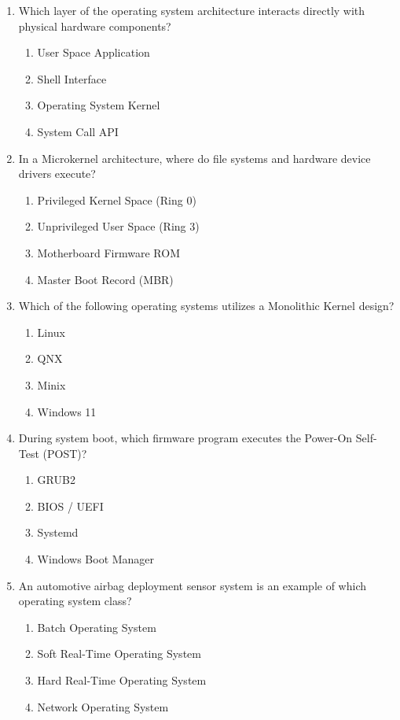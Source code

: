 \begin{enumerate}[leftmargin=1.5em]
    \item Which layer of the operating system architecture interacts directly with physical hardware components?
    \begin{enumerate}[label=(\alph*)]
        \item User Space Application
        \item Shell Interface
        \item Operating System Kernel
        \item System Call API
    \end{enumerate}

    \item In a Microkernel architecture, where do file systems and hardware device drivers execute?
    \begin{enumerate}[label=(\alph*)]
        \item Privileged Kernel Space (Ring 0)
        \item Unprivileged User Space (Ring 3)
        \item Motherboard Firmware ROM
        \item Master Boot Record (MBR)
    \end{enumerate}

    \item Which of the following operating systems utilizes a Monolithic Kernel design?
    \begin{enumerate}[label=(\alph*)]
        \item Linux
        \item QNX
        \item Minix
        \item Windows 11
    \end{enumerate}

    \item During system boot, which firmware program executes the Power-On Self-Test (POST)?
    \begin{enumerate}[label=(\alph*)]
        \item GRUB2
        \item BIOS / UEFI
        \item Systemd
        \item Windows Boot Manager
    \end{enumerate}

    \item An automotive airbag deployment sensor system is an example of which operating system class?
    \begin{enumerate}[label=(\alph*)]
        \item Batch Operating System
        \item Soft Real-Time Operating System
        \item Hard Real-Time Operating System
        \item Network Operating System
    \end{enumerate}


\end{enumerate}
